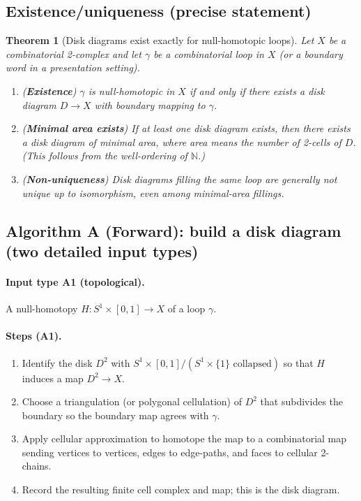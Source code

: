 \documentclass[11pt]{article}
\newtheorem{theorem}{Theorem}[section]
\theoremstyle{definition}
\theoremstyle{plain}
\theoremstyle{remark}
\begin{document}
\subsection*{Existence/uniqueness (precise statement)}
\begin{theorem}[Disk diagrams exist exactly for null-homotopic loops]\label{thm:disk-existence}
Let $X$ be a combinatorial 2-complex and let $\gamma$ be a combinatorial loop in $X$ (or a boundary word in a presentation setting).
\begin{enumerate}[leftmargin=2.2em]
\item (\textbf{Existence}) $\gamma$ is null-homotopic in $X$ if and only if there exists a disk diagram $D\to X$ with boundary mapping to $\gamma$.
\item (\textbf{Minimal area exists}) If at least one disk diagram exists, then there exists a disk diagram of minimal area,
where area means the number of 2-cells of $D$.
(This follows from the well-ordering of $\mathbb N$.)
\item (\textbf{Non-uniqueness}) Disk diagrams filling the same loop are generally not unique up to isomorphism, even among minimal-area fillings.
\end{enumerate}
\end{theorem}

\subsection*{Algorithm A (Forward): build a disk diagram (two detailed input types)}\cite{vanKampen1933,lyndonschupp1977}
\paragraph{Input type A1 (topological).} A null-homotopy $H:S^1\times[0,1]\to X$ of a loop $\gamma$.

\paragraph{Steps (A1).}
\begin{enumerate}[leftmargin=2.2em]
\item Identify the disk $D^2$ with $S^1\times[0,1]/(S^1\times\{1\}\text{ collapsed})$ so that $H$ induces a map $D^2\to X$.
\item Choose a triangulation (or polygonal cellulation) of $D^2$ that subdivides the boundary so the boundary map agrees with $\gamma$.
\item Apply cellular approximation to homotope the map to a combinatorial map sending vertices to vertices, edges to edge-paths, and faces to cellular 2-chains.
\item Record the resulting finite cell complex and map; this is the disk diagram.
\end{enumerate}
\end{document}
